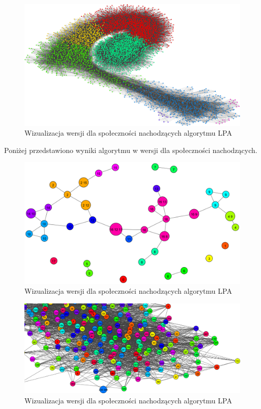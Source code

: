 \documentclass{article}
\begin{document}
\begin{figure}[H]
\centering
\includegraphics[width=\textwidth]{images/ms-m1-nba.png}
\caption{Wizualizacja wersji dla społeczności nachodzących algorytmu LPA}
\end{figure}

Poniżej przedstawiono wyniki algorytmu w wersji dla społeczności nachodzących.

\begin{figure}[H]
\centering
\includegraphics[width=\textwidth]{images/ms-lpa-ol-0.png}
\caption{Wizualizacja wersji dla społeczności nachodzących algorytmu LPA}
\end{figure}

\begin{figure}[H]
\centering
\includegraphics[width=\textwidth]{images/ms-lpa-ol-2.png}
\caption{Wizualizacja wersji dla społeczności nachodzących algorytmu LPA}
\end{figure}
\end{document}
